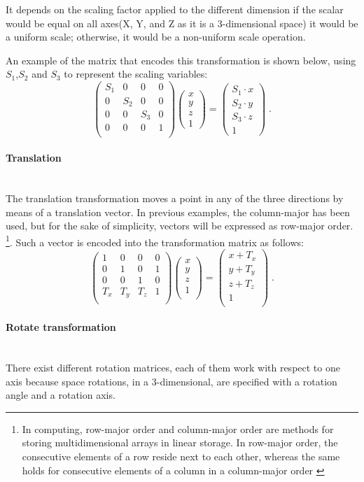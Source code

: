 \documentclass[12pt,a4paper]{extarticle}
\newcommand{\myparagraph}[1]{\paragraph{#1}\mbox{}\\}
\begin{document}
It depends on the scaling factor applied to the different dimension if the scalar would be equal on all axes(X, Y, and Z as it is a 3-dimensional space) it would be a uniform scale; otherwise, it would be a non-uniform scale operation. 

An example of the matrix that encodes this transformation is shown below, using $S_{1}$,$S_{2}$ and $S_{3}$ to represent the scaling variables:
\[
\begin{pmatrix}
S_{1} & 0 & 0 & 0\\
0 & S_{2} & 0 & 0\\
0 & 0 & S_{3} & 0\\
0 & 0 & 0 & 1\\
\end{pmatrix}
\begin{pmatrix}
x\\
y\\
z\\
1
\end{pmatrix}
=
\begin{pmatrix}
S_{1} \cdot x\\
S_{2} \cdot y\\
S_{3} \cdot z \\
1
\end{pmatrix}
\;.
\]
\myparagraph{Translation} The translation transformation moves a point in any of the three directions by means of a translation vector. In previous examples, the column-major has been used, but for the sake of simplicity, vectors will be expressed as row-major order. \footnote{In computing, row-major order and column-major order are methods for storing multidimensional arrays in linear storage. In row-major order, the consecutive elements of a row reside next to each other, whereas the same holds for consecutive elements of a column in a column-major order  \cite{wiki_row_major:1}}. 
Such a vector is encoded into the transformation matrix as follows:
\[
\begin{pmatrix}
1 & 0 & 0 & 0\\
0 & 1 & 0 & 1\\
0 & 0 & 1 & 0\\
T_{x} & T_{y} & T_{z} & 1\\
\end{pmatrix}
\begin{pmatrix}
x\\y\\z\\1\\
\end{pmatrix}
 = 
\begin{pmatrix}
x+T_{x}\\y+T_{y}\\z+T_{z}\\1\\
\end{pmatrix}
 \;.
\]
\myparagraph{Rotate transformation} There exist different rotation matrices, each of them work with respect to one axis because space rotations, in a 3-dimensional, are specified with a rotation angle and a rotation axis.
\end{document}
